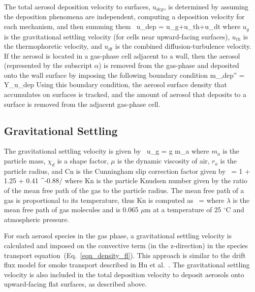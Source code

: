 The total aerosol deposition velocity to surfaces, $u_{dep}$, is determined by assuming the deposition
phenomena are independent, computing a deposition velocity for each mechanism, and then summing
them~\cite{Bixler:1}
\be
u_{dep} = u_g+u_{th}+u_{dt}
\ee
where $u_g$ is the gravitational settling velocity (for cells near upward-facing surfaces), $u_{th}$ is
the thermophoretic velocity, and $u_{dt}$ is the combined diffusion-turbulence velocity. If the aerosol
is located in a gas-phase cell adjacent to a wall, then the aerosol (represented by the subscript $\alpha$)
is removed from the gas-phase and deposited onto the wall surface by imposing the following boundary condition
\be
\dot m_{\alpha,dep}'' = \rho Y_\alpha u_{dep}
\ee
Using this boundary condition, the aerosol surface density that accumulates on surfaces is tracked, and the amount of aerosol that
deposits to a surface is removed from the adjacent gas-phase cell.

\subsection{Gravitational Settling}

The gravitational settling velocity is given by~\cite{Davies_Charles}
\be
u_g = g m_a 
\ee
where $m_a$ is the particle mass, $\chi_d$ is a shape factor, $\mu$ is the dynamic viscosity of air,
$r_a$ is the particle radius, and Cn is the Cunningham slip correction factor given by~\cite{Cunningham:1}
\be
{} = 1 + 1.25 \;  + 0.41 \;  \; ^{-0.88/}
\ee
where Kn is the particle Knudsen number given by the ratio of the mean free path of the gas
to the particle radius. The mean free path of a gas is proportional to its temperature,
thus Kn is computed as~\cite{Sippola:1}
\be
{} =  
\ee
where $\lambda$ is the mean free path of gas molecules and is 0.065 $\mu$m at a temperature of 25 $^\circ$C and atmospheric pressure.

For each aerosol species in the gas phase, a gravitational settling velocity is calculated
and imposed on the convective term (in the z-direction) in the species transport
equation~(Eq.~\ref{eqn_density_fl}). This approach is similar to the drift flux model
for smoke transport described in Hu et al.~\cite{Hu:1}. The gravitational settling velocity
is also included in the total deposition velocity to deposit aerosols onto upward-facing flat surfaces,
as described above.


